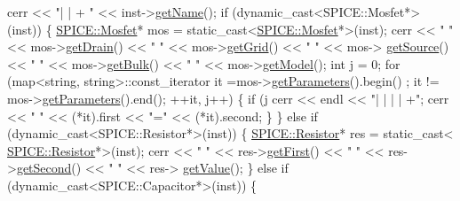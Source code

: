 \begin{DoxyCodeInclude}
            cerr << \textcolor{stringliteral}{"| | + "} << inst->\hyperlink{class_s_p_i_c_e_1_1_instance_ac0fc966d4386ddb71d99361e3fccb311}{getName}();
            \textcolor{keywordflow}{if} (dynamic\_cast<SPICE::Mosfet*>(inst)) \{
                \hyperlink{class_s_p_i_c_e_1_1_mosfet}{SPICE::Mosfet}* mos = \textcolor{keyword}{static\_cast<}\hyperlink{class_s_p_i_c_e_1_1_mosfet}{SPICE::Mosfet}*\textcolor{keyword}{>}(inst);
                cerr << \textcolor{stringliteral}{" "} << mos->\hyperlink{class_s_p_i_c_e_1_1_mosfet_a7265f0565b8368070a3f09c6197a4e9b}{getDrain}() << \textcolor{stringliteral}{" "} << mos->\hyperlink{class_s_p_i_c_e_1_1_mosfet_a796d77755aac0828419f55ba2226bf15}{getGrid}() << \textcolor{stringliteral}{" "} << mos->
      \hyperlink{class_s_p_i_c_e_1_1_mosfet_a1791f52b6b5043823c6f3376e8453e3a}{getSource}() << \textcolor{stringliteral}{" "} << mos->\hyperlink{class_s_p_i_c_e_1_1_mosfet_a56484a169335450d6043ee20086ead93}{getBulk}() << \textcolor{stringliteral}{" "} << mos->\hyperlink{class_s_p_i_c_e_1_1_instance_afc74cbe93df9c473a53db83a325f8f9d}{getModel}();
                \textcolor{keywordtype}{int} j = 0;
                \textcolor{keywordflow}{for} (map<string, string>::const\_iterator it =mos->\hyperlink{class_s_p_i_c_e_1_1_instance_aee7d59083b78d31ac5c19ab508da91e0}{getParameters}().begin() ; it
       != mos->\hyperlink{class_s_p_i_c_e_1_1_instance_aee7d59083b78d31ac5c19ab508da91e0}{getParameters}().end(); ++it, j++) \{
                    \textcolor{keywordflow}{if} (j%
                        cerr << endl << \textcolor{stringliteral}{"| | | | +"};
                    cerr << \textcolor{stringliteral}{" "} << (*it).first << \textcolor{stringliteral}{"="} << (*it).second;
                \}
            \} \textcolor{keywordflow}{else} \textcolor{keywordflow}{if} (dynamic\_cast<SPICE::Resistor*>(inst)) \{
                \hyperlink{class_s_p_i_c_e_1_1_resistor}{SPICE::Resistor}* res = \textcolor{keyword}{static\_cast<}
      \hyperlink{class_s_p_i_c_e_1_1_resistor}{SPICE::Resistor}*\textcolor{keyword}{>}(inst);
                cerr << \textcolor{stringliteral}{" "} << res->\hyperlink{class_s_p_i_c_e_1_1_resistor_ab57aa52f48a5a56c89dd49eae66c1a0f}{getFirst}() << \textcolor{stringliteral}{" "} << res->\hyperlink{class_s_p_i_c_e_1_1_resistor_a9665313821b2fca41e14b9865133af7f}{getSecond}() << \textcolor{stringliteral}{" "} << res->
      \hyperlink{class_s_p_i_c_e_1_1_resistor_a4c052cb2622c580a250b2c783a436882}{getValue}();
            \} \textcolor{keywordflow}{else} \textcolor{keywordflow}{if} (dynamic\_cast<SPICE::Capacitor*>(inst)) \{

\end{DoxyCodeInclude}
